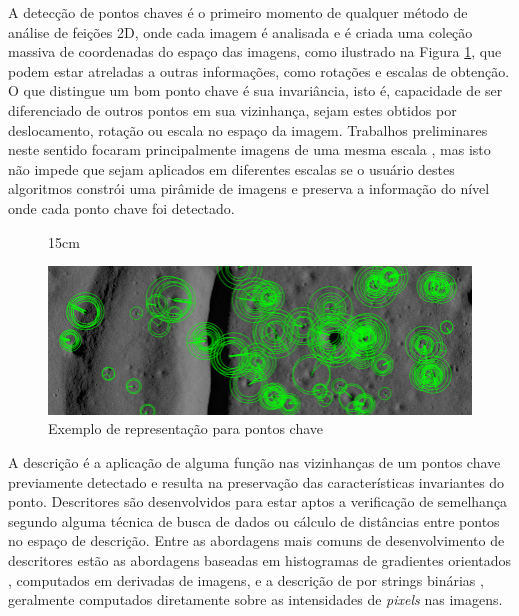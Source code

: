 A detecção de pontos chaves é o primeiro momento de qualquer método de análise de feições 2D, onde cada imagem é analisada e é criada uma coleção massiva de coordenadas do espaço das imagens, como ilustrado na Figura \ref{kpts}, que podem estar atreladas a outras informações, como rotações e escalas de obtenção. O que distingue um bom ponto chave é sua invariância, isto é, capacidade de ser diferenciado de outros pontos em sua vizinhança, sejam estes obtidos por deslocamento, rotação ou escala no espaço da imagem. Trabalhos preliminares neste sentido focaram principalmente imagens de uma mesma escala \cite{harris1988combined}, mas isto não impede que sejam aplicados em diferentes escalas se o usuário destes algoritmos constrói uma pirâmide de imagens e preserva a informação do nível onde cada ponto chave foi detectado.

\begin{figure}[!ht]{15cm}
  \caption{Exemplo de representação para pontos chave} \label{kpts}
  \includegraphics[width=\hsize]{figuras/kpts.png}
\end{figure}

A descrição é a aplicação de alguma função nas vizinhanças de um pontos chave previamente detectado e resulta na preservação das características invariantes do ponto. Descritores são desenvolvidos para estar aptos a verificação de semelhança segundo alguma técnica de busca de dados ou cálculo de distâncias entre pontos no espaço de descrição. Entre as abordagens mais comuns de desenvolvimento de descritores estão as abordagens baseadas em histogramas de gradientes orientados \cite{SIFT1999,SURF}, computados em derivadas de imagens, e a descrição de por strings binárias \cite{AKAZE, ORB}, geralmente computados diretamente sobre as intensidades de \textit{pixels} nas imagens.

